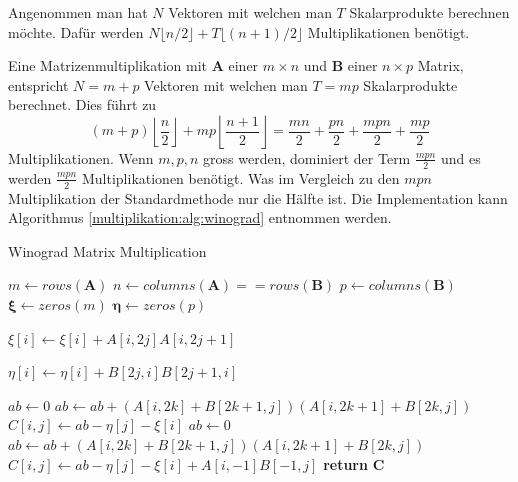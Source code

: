 Angenommen man hat $N$ Vektoren mit welchen man $T$ Skalarprodukte berechnen m\"ochte.
Daf\"ur werden $N\lfloor n/2 \rfloor + T\lfloor (n+1)/2 \rfloor $ Multiplikationen ben\"otigt.

Eine Matrizenmultiplikation mit $\mathbf{A}$ einer $m \times n$ und $\mathbf{B}$ einer $n \times p$ Matrix, entspricht $N=m+p$ Vektoren mit welchen man $T=mp$ Skalarprodukte berechnet.
Dies f\"uhrt zu
\begin{equation}
		(m+p) \left \lfloor \frac{n}{2} \right \rfloor + mp \left \lfloor \frac{n+1}{2} \right \rfloor = \frac{mn}{2} + \frac{pn}{2} + \frac{mpn}{2} + \frac{mp}{2}
\end{equation}
Multiplikationen.
Wenn $m,p,n$ gross werden, dominiert der Term $\frac{mpn}{2}$ und es werden $\frac{mpn}{2}$ Multiplikationen ben\"otigt.
Was im Vergleich zu den $mpn$ Multiplikation der Standardmethode nur die H\"alfte ist.
Die Implementation kann Algorithmus \ref{multiplikation:alg:winograd} entnommen werden.

\begin{algorithm}\caption{Winograd Matrix Multiplication}
	\setlength{\lineskip}{7pt}
	\label{multiplikation:alg:winograd}
	\begin{algorithmic}
		\State  $ m \gets rows(\mathbf{A})$
		\State  $ n \gets columns(\mathbf{A}) == rows(\mathbf{B})$
		\State  $ p \gets columns(\mathbf{B})$
		\State  $ \mathbf{\xi} \gets zeros(m)$
		\State  $ \mathbf{\eta} \gets zeros(p)$


		\State $\xi[i] \gets \xi[i]+A[i,2 j]A[i,2 j+1]$
		\EndFor
		\EndFor

		\State $\eta[i] \gets   \eta[i]+B[2 j,i]B[2 j+1,i]$
		\EndFor
		\EndFor

		\State $ab \gets 0$
		\State $ab \gets ab + (A[i,2k]+B[2k+1,j])(A[i,2k+1]+B[2k,j])$
		\EndFor
		\State $C[i,j] \gets ab-\eta[j]-\xi[i]$
		\EndFor
		\EndFor
    \Else
		\State $ab \gets 0$
		\State $ab \gets ab + (A[i,2k]+B[2k+1,j])(A[i,2k+1]+B[2k,j])$
		\EndFor
		\State $C[i,j] \gets ab-\eta[j]-\xi[i]+A[i,-1]B[-1,j]$
		\EndFor
		\EndFor
		\EndIf
		\State \textbf{return} $\textbf{C}$

		\EndFunction
	\end{algorithmic}
\end{algorithm}


